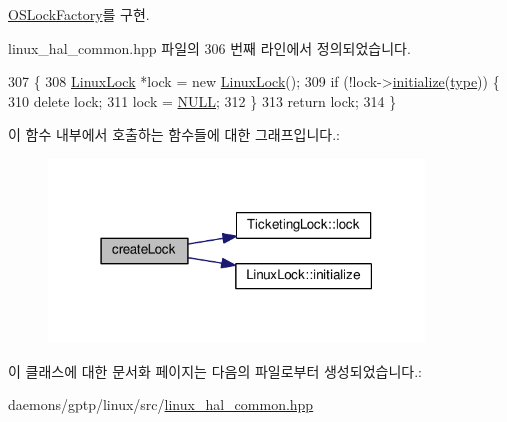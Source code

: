 \hyperlink{class_o_s_lock_factory_ac0789ff714468962f0c1a317d7774585}{O\+S\+Lock\+Factory}를 구현.



linux\+\_\+hal\+\_\+common.\+hpp 파일의 306 번째 라인에서 정의되었습니다.


\begin{DoxyCode}
307     \{
308         \hyperlink{class_linux_lock}{LinuxLock} *lock = \textcolor{keyword}{new} \hyperlink{class_linux_lock}{LinuxLock}();
309         \textcolor{keywordflow}{if} (!lock->\hyperlink{class_linux_lock_abe9590069aa14b3a011b299110c7d50f}{initialize}(\hyperlink{namespaceastime__fitline_a7aead736a07eaf25623ad7bfa1f0ee2d}{type})) \{
310             \textcolor{keyword}{delete} lock;
311             lock = \hyperlink{openavb__types__base__pub_8h_a070d2ce7b6bb7e5c05602aa8c308d0c4}{NULL};
312         \}
313         \textcolor{keywordflow}{return} lock;
314     \}
\end{DoxyCode}


이 함수 내부에서 호출하는 함수들에 대한 그래프입니다.\+:
\nopagebreak
\begin{figure}[H]
\begin{center}
\leavevmode
\includegraphics[width=283pt]{class_linux_lock_factory_ac5b9a10504319d0264f358cf95938c4d_cgraph}
\end{center}
\end{figure}




이 클래스에 대한 문서화 페이지는 다음의 파일로부터 생성되었습니다.\+:\begin{DoxyCompactItemize}
\item 
daemons/gptp/linux/src/\hyperlink{linux__hal__common_8hpp}{linux\+\_\+hal\+\_\+common.\+hpp}\end{DoxyCompactItemize}
